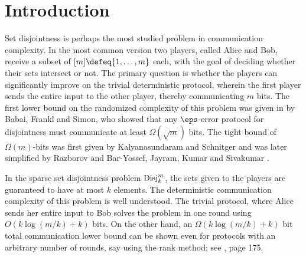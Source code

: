 \section{Introduction}
Set disjointness is perhaps the most studied problem in
communication complexity. In the most common version two
players, called Alice and Bob, receive a subset of
$[m]\defeq\{1,\ldots,m\}$ each, with the goal of deciding
whether their sets intersect or not. The primary question is
whether the players can significantly improve on the trivial
deterministic protocol, wherein the first player sends the
entire input to the other player, thereby communicating $m$
bits. The first lower bound on the randomized complexity of this
problem was given in \cite{BabaiFS1986} by Babai, Frankl and
Simon, who showed that any $\eps$-error protocol for
disjointness must communicate at least $\Omega(\sqrt{m})$ bits.
The tight bound of $\Omega(m)$-bits was first given by
Kalyanasundaram and Schnitger \cite{KalyanasundaramS1992} and
was later simplified by Razborov \cite{Razborov1992} and
Bar-Yossef, Jayram, Kumar and Sivakumar
\cite{Bar-YossefJKS2004}.

In the sparse set disjointness problem $\operatorname{Disj}_k^m$, the sets
given to the players are guaranteed to have at most $k$
elements. The deterministic communication complexity of this
problem is well understood. The trivial protocol, where Alice
sends her entire input to Bob solves the problem in one round
using $O(k\log(m/k) + k)$ bits. On the other hand, an
$\Omega(k\log(m/k) + k)$ bit total communication lower bound can be
shown even for protocols with an arbitrary number of rounds, say
using the rank method; see \cite{KushilevitzN1997}, page 175.

